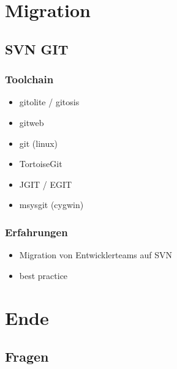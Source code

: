 \documentclass{beamer}
\begin{document}
	\section{Migration}

		\subsection{SVN \rightarrow GIT}

			\begin{frame}
				\frametitle{Toolchain}

				\begin{itemize}
					\item{gitolite / gitosis}
					\item{gitweb}
					\item{git (linux)}
					\item{TortoiseGit}
					\item{JGIT / EGIT}
					\item{msysgit (cygwin)}
				\end{itemize}
			\end{frame}

			\begin{frame}
				\frametitle{Erfahrungen}

				\begin{itemize}
					\item{Migration von Entwicklerteams auf SVN}
					\item{best practice}
				\end{itemize}
			\end{frame}

	\section{Ende}
		\subsection{Fragen}
\end{document}
